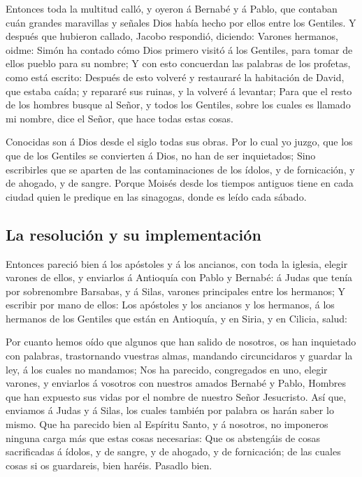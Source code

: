  Entonces toda la multitud calló, y oyeron á Bernabé y á
Pablo, que contaban cuán grandes maravillas y señales Dios había hecho
por ellos entre los Gentiles.  Y después que hubieron
callado, Jacobo respondió, diciendo: Varones hermanos, oidme:
 Simón ha contado cómo Dios primero visitó á los Gentiles,
para tomar de ellos pueblo para su nombre;  Y con esto
concuerdan las palabras de los profetas, como está escrito:
 Después de esto volveré y restauraré la habitación de
David, que estaba caída; y repararé sus ruinas, y la volveré á levantar;
 Para que el resto de los hombres busque al Señor, y todos
los Gentiles, sobre los cuales es llamado mi nombre, dice el Señor, que
hace todas estas cosas.

 Conocidas son á Dios desde el siglo todas sus obras.
 Por lo cual yo juzgo, que los que de los Gentiles se
convierten á Dios, no han de ser inquietados;  Sino
escribirles que se aparten de las contaminaciones de los ídolos, y de
fornicación, y de ahogado, y de sangre.  Porque Moisés
desde los tiempos antiguos tiene en cada ciudad quien le predique en las
sinagogas, donde es leído cada sábado.

\hypertarget{la-resoluciuxf3n-y-su-implementaciuxf3n}{%
\subsection{La resolución y su
implementación}\label{la-resoluciuxf3n-y-su-implementaciuxf3n}}

 Entonces pareció bien á los apóstoles y á los ancianos,
con toda la iglesia, elegir varones de ellos, y enviarlos á Antioquía
con Pablo y Bernabé: á Judas que tenía por sobrenombre Barsabas, y á
Silas, varones principales entre los hermanos;  Y escribir
por mano de ellos: Los apóstoles y los ancianos y los hermanos, á los
hermanos de los Gentiles que están en Antioquía, y en Siria, y en
Cilicia, salud:

 Por cuanto hemos oído que algunos que han salido de
nosotros, os han inquietado con palabras, trastornando vuestras almas,
mandando circuncidaros y guardar la ley, á los cuales no mandamos;
 Nos ha parecido, congregados en uno, elegir varones, y
enviarlos á vosotros con nuestros amados Bernabé y Pablo, 
Hombres que han expuesto sus vidas por el nombre de nuestro Señor
Jesucristo.  Así que, enviamos á Judas y á Silas, los
cuales también por palabra os harán saber lo mismo.  Que ha
parecido bien al Espíritu Santo, y á nosotros, no imponeros ninguna
carga más que estas cosas necesarias:  Que os abstengáis de
cosas sacrificadas á ídolos, y de sangre, y de ahogado, y de
fornicación; de las cuales cosas si os guardareis, bien haréis. Pasadlo
bien.

